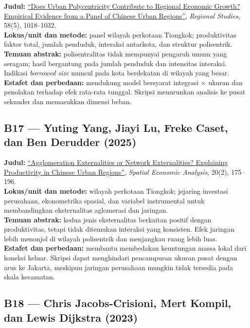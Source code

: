 \documentclass[
  indonesian,
  11pt,
  a4paper,
  oneside,
  openany]{report}
\begin{document}
\textbf{Judul:}
\href{https://doi.org/10.1080/00343404.2023.2255623}{``Does Urban
Polycentricity Contribute to Regional Economic Growth? Empirical
Evidence from a Panel of Chinese Urban Regions''}, \emph{Regional
Studies}, 58(5), 1018--1032.\\
\textbf{Lokus/unit dan metode:} panel wilayah perkotaan Tiongkok;
produktivitas faktor total, jumlah penduduk, interaksi antarkota, dan
struktur polisentrik.\\
\textbf{Temuan abstrak:} polisentralitas tidak mempunyai pengaruh umum
yang seragam; hasil bergantung pada jumlah penduduk dan intensitas
interaksi. Indikasi \emph{borrowed size} muncul pada kota berdekatan di
wilayah yang besar.\\
\textbf{Estafet dan perbedaan:} mendukung model bersyarat integrasi ×
ukuran dan penolakan terhadap efek rata-rata tunggal. Skripsi menurunkan
analisis ke pusat sekunder dan memasukkan dimensi beban.

\subsection{B17 --- Yuting Yang, Jiayi Lu, Freke Caset, dan Ben Derudder
(2025)}\label{b17-yuting-yang-jiayi-lu-freke-caset-dan-ben-derudder-2025}

\textbf{Judul:}
\href{https://doi.org/10.1080/17421772.2024.2414960}{``Agglomeration
Externalities or Network Externalities? Explaining Productivity in
Chinese Urban Regions''}, \emph{Spatial Economic Analysis}, 20(2),
175--196.\\
\textbf{Lokus/unit dan metode:} wilayah perkotaan Tiongkok; jejaring
investasi perusahaan, ekonometrika spasial, dan variabel instrumental
untuk membandingkan eksternalitas aglomerasi dan jaringan.\\
\textbf{Temuan abstrak:} kedua jenis eksternalitas berkaitan positif
dengan produktivitas, tetapi tidak ditemukan interaksi yang konsisten.
Efek jaringan lebih menonjol di wilayah polisentrik dan menjangkau ruang
lebih luas.\\
\textbf{Estafet dan perbedaan:} membantu membedakan keuntungan massa
lokal dari koneksi keluar. Skripsi dapat menghindari pencampuran ukuran
pusat dengan arus ke Jakarta, meskipun jaringan perusahaan mungkin tidak
tersedia pada skala kecamatan.

\subsection{B18 --- Chris Jacobs-Crisioni, Mert Kompil, dan Lewis
Dijkstra
(2023)}\label{b18-chris-jacobs-crisioni-mert-kompil-dan-lewis-dijkstra-2023}
\end{document}
